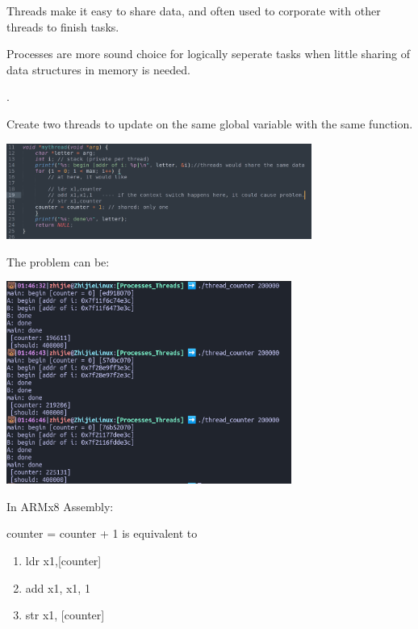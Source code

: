 
    Threads make it easy to share data, and often used to corporate with other threads
    to finish tasks.

    Processes are more sound choice for logically seperate tasks when little sharing
    of data structures in memory is needed.



    .

    Create two threads to update on the same global variable with the same function.
    
    \includegraphics[width=0.75\textwidth]{chapters/Cucurrency/Cucurrency/thread_function.png}

    The problem can be:

    \includegraphics[width=0.7\textwidth]{chapters/Cucurrency/Cucurrency/thread_conflicts.png}



    In ARMx8 Assembly:

    counter = counter + 1 is equivalent to 
    \begin{enumerate}
        \item ldr x1,[counter]
        \item add x1, x1, 1
        \item str x1, [counter]
    \end{enumerate}


